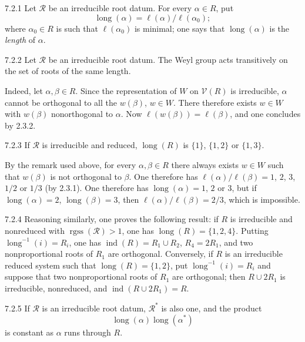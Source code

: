 \begin{definition}{7.2.1}\label{XXI.7.2.1}
Let $\mathcal R$ be an irreducible root datum. For every $\alpha\in R$, put
\[
\operatorname{long}(\alpha)=\ell(\alpha)/\ell(\alpha_0);
\]
where $\alpha_0\in R$ is such that $\ell(\alpha_0)$ is minimal; one says that $\operatorname{long}(\alpha)$ is the \emph{length} of $\alpha$.
\end{definition}
\begin{lemma}{7.2.2}\label{XXI.7.2.2}
Let $\mathcal R$ be an irreducible root datum. The Weyl group acts transitively on the set of roots of the same length.
\end{lemma}
Indeed, let $\alpha,\beta\in R$. Since the representation of $W$ on $\mathcal V(R)$ is irreducible, $\alpha$ cannot be orthogonal to all the $w(\beta)$, $w\in W$. There therefore exists $w\in W$ with $w(\beta)$ nonorthogonal to $\alpha$. Now $\ell(w(\beta))=\ell(\beta)$, and one concludes by 2.3.2.
\begin{lemma}{7.2.3}\label{XXI.7.2.3}
If $\mathcal R$ is irreducible and reduced, $\operatorname{long}(R)$ is $\{1\}$, $\{1,2\}$ or $\{1,3\}$.
\end{lemma}
By the remark used above, for every $\alpha,\beta\in R$ there always exists $w\in W$ such that $w(\beta)$ is not orthogonal to $\beta$. One therefore has $\ell(\alpha)/\ell(\beta)=1$, $2$, $3$, $1/2$ or $1/3$ (by 2.3.1). One therefore has $\operatorname{long}(\alpha)=1$, $2$ or $3$, but if $\operatorname{long}(\alpha)=2$, $\operatorname{long}(\beta)=3$, then $\ell(\alpha)/\ell(\beta)=2/3$, which is impossible.
\begin{remark}{7.2.4}\label{XXI.7.2.4}
Reasoning similarly, one proves the following result: if $R$ is irreducible and nonreduced with $\operatorname{rgss}(\mathcal R)>1$, one has $\operatorname{long}(R)=\{1,2,4\}$. Putting $\operatorname{long}^{-1}(i)=R_i$, one has $\operatorname{ind}(R)=R_1\cup R_2$, $R_4=2R_1$, and two nonproportional roots of $R_1$ are orthogonal. Conversely, if $R$ is an irreducible reduced system such that $\operatorname{long}(R)=\{1,2\}$, put $\operatorname{long}^{-1}(i)=R_i$ and suppose that two nonproportional roots of $R_1$ are orthogonal; then $R\cup2R_1$ is irreducible, nonreduced, and $\operatorname{ind}(R\cup2R_1)=R$.
\end{remark}
\begin{lemma}{7.2.5}\label{XXI.7.2.5}
If $\mathcal R$ is an irreducible root datum, $\mathcal R^*$ is also one, and the product
\[\operatorname{long}(\alpha)\operatorname{long}(\alpha^*)\]
is constant as $\alpha$ runs through $R$.
\end{lemma}
